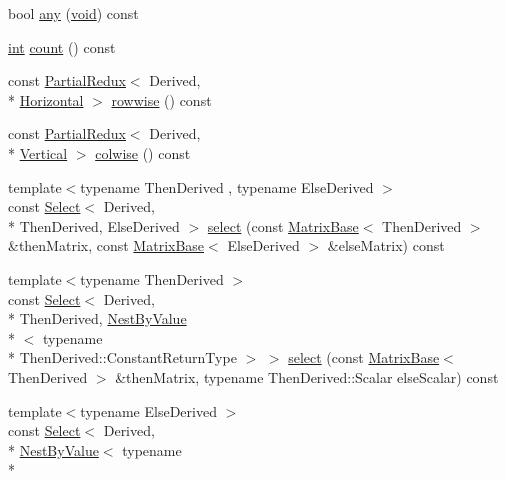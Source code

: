 \begin{DoxyCompactItemize}
bool \hyperlink{class_matrix_base_a7f022e3af6bb74be583f58b686edd09f}{any} (\hyperlink{group___u_a_v_objects_plugin_ga444cf2ff3f0ecbe028adce838d373f5c}{void}) const 
\item 
\hyperlink{ioapi_8h_a787fa3cf048117ba7123753c1e74fcd6}{int} \hyperlink{class_matrix_base_afb09e0eb927ae276bbed8488497a24f7}{count} () const 
\item 
const \hyperlink{class_partial_redux}{Partial\-Redux}$<$ Derived, \\*
\hyperlink{_constants_8h_a8ef30fa9c08e08c8706653571f9f5b81a7d5f78c516bedc0a066182a6fd606b8b}{Horizontal} $>$ \hyperlink{class_matrix_base_aebd5699cf5758edecbef6a16c6fed4f1}{rowwise} () const 
\item 
const \hyperlink{class_partial_redux}{Partial\-Redux}$<$ Derived, \\*
\hyperlink{_constants_8h_a8ef30fa9c08e08c8706653571f9f5b81a2434cd8c1a594a4cdaa250f86639c600}{Vertical} $>$ \hyperlink{class_matrix_base_aa3b6a7cd048404185023d21eaeac21ba}{colwise} () const 
\item 
{\footnotesize template$<$typename Then\-Derived , typename Else\-Derived $>$ }\\const \hyperlink{class_select}{Select}$<$ Derived, \\*
Then\-Derived, Else\-Derived $>$ \hyperlink{class_matrix_base_aff35a2661a7a22955d7abfa75d71e3b7}{select} (const \hyperlink{class_matrix_base}{Matrix\-Base}$<$ Then\-Derived $>$ \&then\-Matrix, const \hyperlink{class_matrix_base}{Matrix\-Base}$<$ Else\-Derived $>$ \&else\-Matrix) const 
\item 
{\footnotesize template$<$typename Then\-Derived $>$ }\\const \hyperlink{class_select}{Select}$<$ Derived, \\*
Then\-Derived, \hyperlink{class_nest_by_value}{Nest\-By\-Value}\\*
$<$ typename \\*
Then\-Derived\-::\-Constant\-Return\-Type $>$ $>$ \hyperlink{class_matrix_base_aad2a7da6f623b169892ffd8ce133f992}{select} (const \hyperlink{class_matrix_base}{Matrix\-Base}$<$ Then\-Derived $>$ \&then\-Matrix, typename Then\-Derived\-::\-Scalar else\-Scalar) const 
\item 
{\footnotesize template$<$typename Else\-Derived $>$ }\\const \hyperlink{class_select}{Select}$<$ Derived, \\*
\hyperlink{class_nest_by_value}{Nest\-By\-Value}$<$ typename \\*

\end{DoxyCompactItemize}
